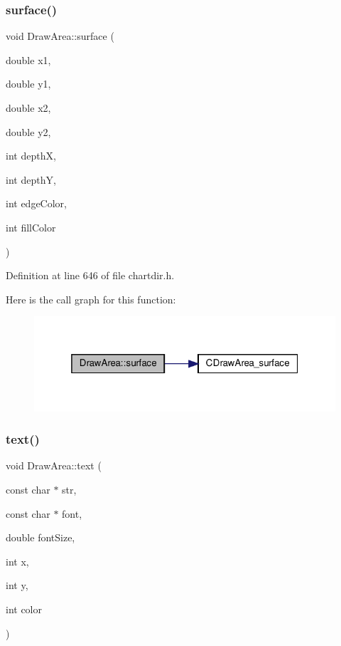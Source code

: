 \subsubsection{\texorpdfstring{surface()}{surface()}}
{\footnotesize\ttfamily void Draw\+Area\+::surface (\begin{DoxyParamCaption}\item[{double}]{x1,  }\item[{double}]{y1,  }\item[{double}]{x2,  }\item[{double}]{y2,  }\item[{int}]{depthX,  }\item[{int}]{depthY,  }\item[{int}]{edge\+Color,  }\item[{int}]{fill\+Color }\end{DoxyParamCaption})\hspace{0.3cm}{\ttfamily [inline]}}



Definition at line 646 of file chartdir.\+h.

Here is the call graph for this function\+:
\nopagebreak
\begin{figure}[H]
\begin{center}
\leavevmode
\includegraphics[width=319pt]{class_draw_area_a459880cd624ba786e7d0bee6f6f080d0_cgraph}
\end{center}
\end{figure}
\mbox{\label{class_draw_area_a6656043a957ba9eccacfccc711027d99}} 
\subsubsection{\texorpdfstring{text()}{text()}\hspace{0.1cm}{\footnotesize\ttfamily [1/8]}}
{\footnotesize\ttfamily void Draw\+Area\+::text (\begin{DoxyParamCaption}\item[{const char $\ast$}]{str,  }\item[{const char $\ast$}]{font,  }\item[{double}]{font\+Size,  }\item[{int}]{x,  }\item[{int}]{y,  }\item[{int}]{color }\end{DoxyParamCaption})\hspace{0.3cm}{\ttfamily [inline]}}




